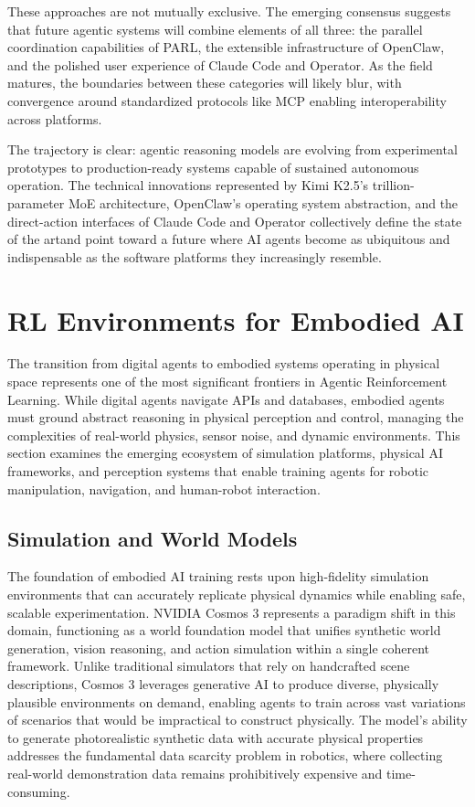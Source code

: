 These approaches are not mutually exclusive. The emerging consensus suggests that future agentic systems will combine elements of all three: the parallel coordination capabilities of PARL, the extensible infrastructure of OpenClaw, and the polished user experience of Claude Code and Operator. As the field matures, the boundaries between these categories will likely blur, with convergence around standardized protocols like MCP enabling interoperability across platforms.

The trajectory is clear: agentic reasoning models are evolving from experimental prototypes to production-ready systems capable of sustained autonomous operation. The technical innovations represented by Kimi K2.5's trillion-parameter MoE architecture, OpenClaw's operating system abstraction, and the direct-action interfaces of Claude Code and Operator collectively define the state of the artand point toward a future where AI agents become as ubiquitous and indispensable as the software platforms they increasingly resemble.
\section{RL Environments for Embodied AI}

The transition from digital agents to embodied systems operating in physical space represents one of the most significant frontiers in Agentic Reinforcement Learning. While digital agents navigate APIs and databases, embodied agents must ground abstract reasoning in physical perception and control, managing the complexities of real-world physics, sensor noise, and dynamic environments. This section examines the emerging ecosystem of simulation platforms, physical AI frameworks, and perception systems that enable training agents for robotic manipulation, navigation, and human-robot interaction.

\subsection{Simulation and World Models}

The foundation of embodied AI training rests upon high-fidelity simulation environments that can accurately replicate physical dynamics while enabling safe, scalable experimentation. NVIDIA Cosmos 3 represents a paradigm shift in this domain, functioning as a world foundation model that unifies synthetic world generation, vision reasoning, and action simulation within a single coherent framework. Unlike traditional simulators that rely on handcrafted scene descriptions, Cosmos 3 leverages generative AI to produce diverse, physically plausible environments on demand, enabling agents to train across vast variations of scenarios that would be impractical to construct physically. The model's ability to generate photorealistic synthetic data with accurate physical properties addresses the fundamental data scarcity problem in robotics, where collecting real-world demonstration data remains prohibitively expensive and time-consuming.

